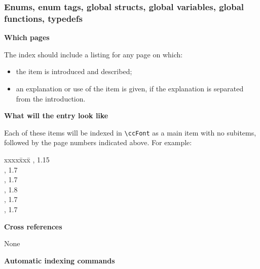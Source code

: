 \documentclass[11pt]{article}
\newenvironment{indexex}{\begin{tabbing}
xxxx\=xxx\=\kill}{\end{tabbing}}
\begin{document}
\subsubsection{Enums,
            enum tags,
            global structs,
            global variables,
            global functions,
            typedefs}%
%
%
%
%
%
%
\label{enums_etc}

\begin{description}
   \item{\bf Which pages}

         The index should include a listing for any page on which:
           \begin{itemize}
                \item the item is introduced and described;
                \item an explanation or use of the item is given, if the 
                      explanation is separated from the introduction.
           \end{itemize}
   \item{\bf What will the entry look like} 

        Each of these items will be indexed in \verb|\ccFont| as a main 
        item with no subitems, followed by the page numbers indicated above.  
        For example:
        \begin{indexex}
        ,                  1.15 \\
        ,                                 1.7  \\
        ,                                 1.7  \\
        ,                         1.8  \\
        ,                                  1.7  \\
        ,                          1.7
        \end{indexex}

   \item {\bf Cross references} 

         None

   \item {\bf Automatic indexing commands}%


\end{description}
\end{document}
